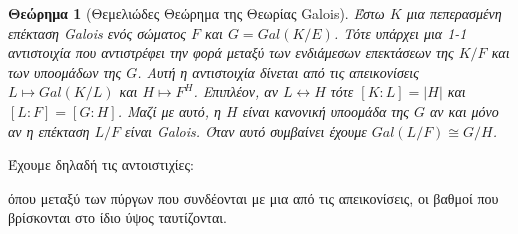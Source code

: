 \documentclass[oneside,a4paper]{article}
\newtheorem{theorem}{Θεώρημα}
\newcommand {\tl}{\textlatin}
\begin{document}
\begin{theorem}[Θεμελιώδες Θεώρημα της Θεωρίας \tl{Galois}]
	Έστω $K$ μια πεπερασμένη επέκταση \tl{Galois} ενός σώματος $F$ και $G=Gal(K/E)$. Τότε υπάρχει μια 1-1 αντιστοιχία που αντιστρέφει την φορά μεταξύ των ενδιάμεσων επεκτάσεων της $K/F$ και των υποομάδων της $G$. Αυτή η αντιστοιχία δίνεται από τις απεικονίσεις $L \mapsto Gal(K/L)$ και $H \mapsto F^H$. Επιπλέον, αν $L\leftrightarrow H$ τότε $[K:L] = |H|$ και $[L:F] = [G:H]$. Μαζί με αυτό, η $H$ είναι κανονική υποομάδα της $G$ αν και μόνο αν η επέκταση $L/F$ είναι \tl{Galois}. Όταν αυτό συμβαίνει έχουμε $Gal(L/F) \cong G/H$.
\end{theorem}
Έχουμε δηλαδή τις αντοιστιχίες:
\begin{center}
\end{center}
όπου μεταξύ των πύργων που συνδέονται με μια από τις απεικονίσεις, οι βαθμοί που βρίσκονται στο ίδιο ύψος ταυτίζονται.
\end{document}

